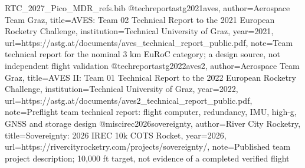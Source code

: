 \begin{filecontents*}[overwrite]{RTC_2027_Pico_MDR_refs.bib}
@techreport{astg2021aves,
 author={{Aerospace Team Graz}},
 title={{AVES}: Team 02 Technical Report to the 2021 European Rocketry Challenge},
 institution={Technical University of Graz}, year={2021},
 url={https://astg.at/documents/aves_technical_report_public.pdf},
 note={Team technical report for the nominal 3 km EuRoC category; a design source, not independent flight validation}
}
@techreport{astg2022aves2,
 author={{Aerospace Team Graz}},
 title={{AVES II}: Team 01 Technical Report to the 2022 European Rocketry Challenge},
 institution={Technical University of Graz}, year={2022},
 url={https://astg.at/documents/aves2_technical_report_public.pdf},
 note={Preflight team technical report: flight computer, redundancy, IMU, high-g, GNSS and storage design}
}
@misc{irec2026sovereignty,
 author={{River City Rocketry}},
 title={Sovereignty: 2026 IREC 10k COTS Rocket},
 year={2026},
 url={https://rivercityrocketry.com/projects/sovereignty/},
 note={Published team project description; 10,000 ft target, not evidence of a completed verified flight}
}

\end{filecontents*}

\documentclass[10pt,a4paper]{article}
\usepackage[a4paper,margin=17mm,top=18mm,bottom=18mm]{geometry}
\usepackage[T1]{fontenc}
\usepackage[utf8]{inputenc}
\usepackage{lmodern,microtype}
\usepackage{amssymb}
\usepackage[table]{xcolor}
\usepackage{booktabs,tabularx,longtable,array}
\usepackage{enumitem}
\usepackage{tikz}
\usepackage{pgfplots}
\pgfplotsset{compat=1.18}
\usepackage{pgfgantt}
\usetikzlibrary{arrows.meta,positioning,shapes.geometric,calc}
\usepackage{csquotes}
\usepackage[unicode,colorlinks=true,linkcolor=blue!55!black,urlcolor=blue!55!black,citecolor=blue!55!black]{hyperref}
\usepackage[backend=biber,style=ieee,sorting=none,maxnames=5]{biblatex}

\usepackage{fancyhdr,titlesec}
\usepackage{ragged2e}
\usepackage{caption}
\captionsetup{font=small,labelfont=bf}


